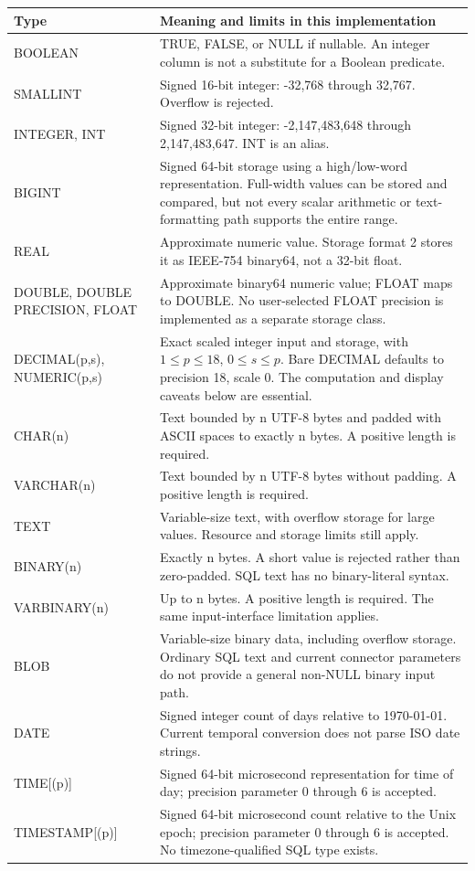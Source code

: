 \begin{longtable}{p{.25\linewidth}p{.68\linewidth}}
\toprule
Type & Meaning and limits in this implementation \\
\midrule
\endhead
BOOLEAN & TRUE, FALSE, or NULL if nullable. An integer column is not a substitute for a Boolean predicate. \\
SMALLINT & Signed 16-bit integer: -32,768 through 32,767. Overflow is rejected. \\
INTEGER, INT & Signed 32-bit integer: -2,147,483,648 through 2,147,483,647. INT is an alias. \\
BIGINT & Signed 64-bit storage using a high/low-word representation. Full-width values can be stored and compared, but not every scalar arithmetic or text-formatting path supports the entire range. \\
REAL & Approximate numeric value. Storage format 2 stores it as IEEE-754 binary64, not a 32-bit float. \\
DOUBLE, DOUBLE PRECISION, FLOAT & Approximate binary64 numeric value; FLOAT maps to DOUBLE. No user-selected FLOAT precision is implemented as a separate storage class. \\
DECIMAL(p,s), NUMERIC(p,s) & Exact scaled integer input and storage, with \(1\leq p\leq18\), \(0\leq s\leq p\). Bare DECIMAL defaults to precision 18, scale 0. The computation and display caveats below are essential. \\
CHAR(n) & Text bounded by n UTF-8 bytes and padded with ASCII spaces to exactly n bytes. A positive length is required. \\
VARCHAR(n) & Text bounded by n UTF-8 bytes without padding. A positive length is required. \\
TEXT & Variable-size text, with overflow storage for large values. Resource and storage limits still apply. \\
BINARY(n) & Exactly n bytes. A short value is rejected rather than zero-padded. SQL text has no binary-literal syntax. \\
VARBINARY(n) & Up to n bytes. A positive length is required. The same input-interface limitation applies. \\
BLOB & Variable-size binary data, including overflow storage. Ordinary SQL text and current connector parameters do not provide a general non-NULL binary input path. \\
DATE & Signed integer count of days relative to 1970-01-01. Current temporal conversion does not parse ISO date strings. \\
TIME[(p)] & Signed 64-bit microsecond representation for time of day; precision parameter 0 through 6 is accepted. \\
TIMESTAMP[(p)] & Signed 64-bit microsecond count relative to the Unix epoch; precision parameter 0 through 6 is accepted. No timezone-qualified SQL type exists. \\
\bottomrule
\end{longtable}

